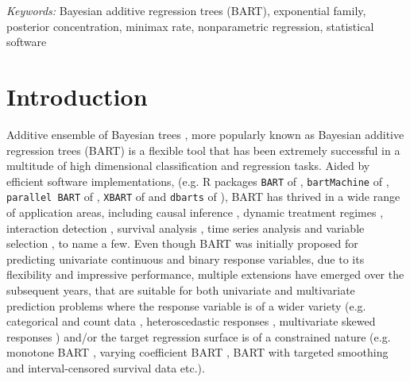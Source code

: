 \documentclass[12pt]{article}
\newcommand{\1}{\mathbb{I}}
\theoremstyle{plain}
\theoremstyle{definition}
\theoremstyle{remark}
\begin{document}
\noindent%
{\it Keywords:}  Bayesian additive regression trees (BART), exponential family, posterior concentration, minimax rate, nonparametric regression, statistical software

\section{Introduction}
\label{sec:intro}

Additive ensemble of Bayesian trees  \citep{chipman1998bayesian, denison1998bayesian}, more popularly known as Bayesian additive regression trees (BART) \citep{chipman2010bart} is a flexible tool that has been extremely successful in a multitude of high dimensional classification and regression tasks. Aided by efficient software implementations, (e.g. R packages \texttt{BART} of \cite{sparapani2019bart}, \texttt{bartMachine} of \cite{bleich2014variable}, \texttt{parallel BART} of \cite{pratola2014parallel}, \texttt{XBART} of \cite{he2019xbart} and \texttt{dbarts} of \cite{dorie2025package}), BART has thrived in a wide range of application areas, including causal inference \citep{hill2011bayesian, hill2013assessing, hahn2017bayesian}, dynamic treatment regimes \citep{li2024dynamic}, interaction detection \citep{du2019interaction}, survival analysis \citep{sparapani2016nonparametric}, time series analysis \citep{taddy2011dynamic, deshpande2020vc} and variable selection \citep{bleich2014variable, linero2018bayesian, liu2018abc, liu2020variable}, to name a few. Even though BART was initially proposed for predicting univariate continuous and binary response variables, due to its flexibility and impressive performance, multiple extensions have emerged over the subsequent years, that are suitable for both univariate and multivariate prediction problems where the response variable is of a wider variety (e.g. categorical and count data \citep{murray2017log}, heteroscedastic responses \citep{pratola2019heteroscedastic}, multivariate skewed responses \citep{um2023bayesian}) and/or the target regression surface is of a constrained nature (e.g. monotone BART \citep{chipman2016high}, varying coefficient BART \citep{deshpande2020vc}, BART with targeted smoothing \citep{starling2020bart} and interval-censored survival data \citep{basak2022semiparametric} etc.).
\end{document}
